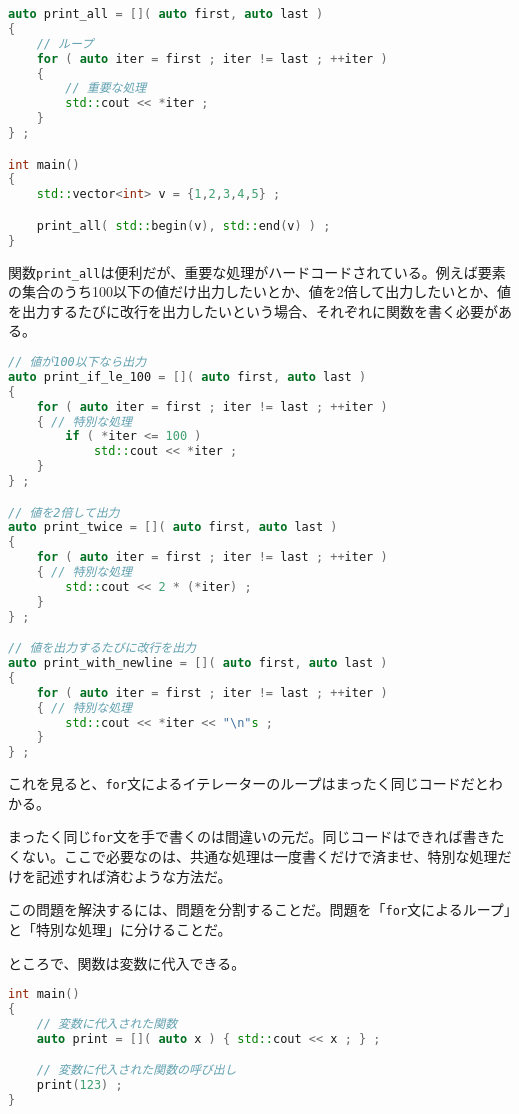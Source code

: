 \begin{lstlisting}[language={C++}]
auto print_all = []( auto first, auto last )
{
    // ループ
    for ( auto iter = first ; iter != last ; ++iter )
    {
        // 重要な処理
        std::cout << *iter ;
    }
} ; 

int main()
{
    std::vector<int> v = {1,2,3,4,5} ;

    print_all( std::begin(v), std::end(v) ) ;
}
\end{lstlisting}

関数\texttt{print\_all}は便利だが、重要な処理がハードコードされている。例えば要素の集合のうち100以下の値だけ出力したいとか、値を2倍して出力したいとか、値を出力するたびに改行を出力したいという場合、それぞれに関数を書く必要がある。

\begin{lstlisting}[language={C++}]
// 値が100以下なら出力
auto print_if_le_100 = []( auto first, auto last )
{
    for ( auto iter = first ; iter != last ; ++iter )
    { // 特別な処理
        if ( *iter <= 100 )
            std::cout << *iter ;
    }
} ;

// 値を2倍して出力
auto print_twice = []( auto first, auto last )
{
    for ( auto iter = first ; iter != last ; ++iter )
    { // 特別な処理
        std::cout << 2 * (*iter) ;
    }
} ;

// 値を出力するたびに改行を出力
auto print_with_newline = []( auto first, auto last )
{
    for ( auto iter = first ; iter != last ; ++iter )
    { // 特別な処理
        std::cout << *iter << "\n"s ;
    }
} ;
\end{lstlisting}

これを見ると、\texttt{for}文によるイテレーターのループはまったく同じコードだとわかる。

まったく同じ\texttt{for}文を手で書くのは間違いの元だ。同じコードはできれば書きたくない。ここで必要なのは、共通な処理は一度書くだけで済ませ、特別な処理だけを記述すれば済むような方法だ。

この問題を解決するには、問題を分割することだ。問題を「\texttt{for}文によるループ」と「特別な処理」に分けることだ。

ところで、関数は変数に代入できる。

\ifTombow\pagebreak\fi
\begin{lstlisting}[language={C++}]
int main()
{
    // 変数に代入された関数
    auto print = []( auto x ) { std::cout << x ; } ;

    // 変数に代入された関数の呼び出し
    print(123) ;
}
\end{lstlisting}

